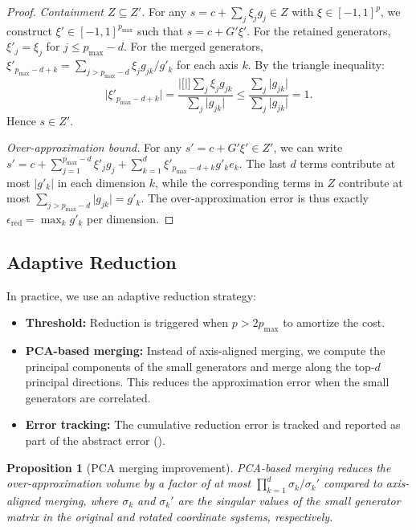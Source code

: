 \documentclass[11pt]{article}
\newtheorem{proposition}[theorem]{Proposition}
\newcommand{\abs}[1]{\lvert #1 \rvert}
\begin{document}
\begin{proof}
\emph{Containment $Z \subseteq Z'$.}
For any $s = c + \sum_{j} \xi_j g_j \in Z$ with $\xi \in [-1,1]^p$,
we construct $\xi' \in [-1,1]^{p_{\max}}$ such that $s = c + G'\xi'$.
For the retained generators, $\xi'_j = \xi_j$ for $j \leq p_{\max} - d$.
For the merged generators, $\xi'_{p_{\max}-d+k} = \sum_{j > p_{\max}-d} \xi_j g_{jk} / g'_k$
for each axis $k$. By the triangle inequality:
\[
  \abs{\xi'_{p_{\max}-d+k}} = \frac{\abs[\big]{\sum_j \xi_j g_{jk}}}{\sum_j \abs{g_{jk}}}
  \leq \frac{\sum_j \abs{g_{jk}}}{\sum_j \abs{g_{jk}}} = 1.
\]
Hence $s \in Z'$.

\emph{Over-approximation bound.}
For any $s' = c + G'\xi' \in Z'$, we can write
$s' = c + \sum_{j=1}^{p_{\max}-d} \xi'_j g_j + \sum_{k=1}^{d} \xi'_{p_{\max}-d+k} g'_k e_k$.
The last $d$ terms contribute at most $\abs{g'_k}$ in each dimension $k$,
while the corresponding terms in $Z$ contribute at most
$\sum_{j > p_{\max}-d} \abs{g_{jk}} = g'_k$. The over-approximation error
is thus exactly $\epsilon_{\text{red}} = \max_k g'_k$ per dimension.
\end{proof}

\subsection{Adaptive Reduction}

In practice, we use an adaptive reduction strategy:
\begin{itemize}[nosep]
\item \textbf{Threshold:} Reduction is triggered when $p > 2 p_{\max}$
to amortize the cost.
\item \textbf{PCA-based merging:} Instead of axis-aligned merging, we
compute the principal components of the small generators and merge
along the top-$d$ principal directions. This reduces the approximation
error when the small generators are correlated.
\item \textbf{Error tracking:} The cumulative reduction error is tracked
and reported as part of the abstract error ().
\end{itemize}

\begin{proposition}[PCA merging improvement]
\label{prop:pca-merge}
PCA-based merging reduces the over-approximation volume by a factor of at
most $\prod_{k=1}^{d} \sigma_k / \sigma_k'$ compared to axis-aligned merging,
where $\sigma_k$ and $\sigma_k'$ are the singular values of the small generator
matrix in the original and rotated coordinate systems, respectively.
\end{proposition}
\end{document}

